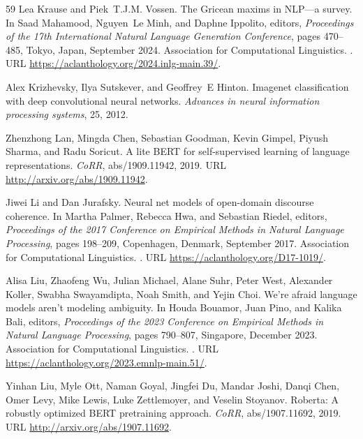 \begin{thebibliography}{59}
Lea Krause and Piek~T.J.M. Vossen.
\newblock The {G}ricean maxims in {NLP}---a survey.
\newblock In Saad Mahamood, Nguyen~Le Minh, and Daphne Ippolito, editors, \emph{Proceedings of the 17th International Natural Language Generation Conference}, pages 470--485, Tokyo, Japan, September 2024. Association for Computational Linguistics.
\newblock {}.
\newblock URL \url{https://aclanthology.org/2024.inlg-main.39/}.

Alex Krizhevsky, Ilya Sutskever, and Geoffrey~E Hinton.
\newblock Imagenet classification with deep convolutional neural networks.
\newblock \emph{Advances in neural information processing systems}, 25, 2012.

Zhenzhong Lan, Mingda Chen, Sebastian Goodman, Kevin Gimpel, Piyush Sharma, and Radu Soricut.
 {A} lite {BERT} for self-supervised learning of language representations.
\newblock \emph{CoRR}, abs/1909.11942, 2019.
\newblock URL \url{http://arxiv.org/abs/1909.11942}.

Jiwei Li and Dan Jurafsky.
\newblock Neural net models of open-domain discourse coherence.
\newblock In Martha Palmer, Rebecca Hwa, and Sebastian Riedel, editors, \emph{Proceedings of the 2017 Conference on Empirical Methods in Natural Language Processing}, pages 198--209, Copenhagen, Denmark, September 2017. Association for Computational Linguistics.
\newblock {}.
\newblock URL \url{https://aclanthology.org/D17-1019/}.

Alisa Liu, Zhaofeng Wu, Julian Michael, Alane Suhr, Peter West, Alexander Koller, Swabha Swayamdipta, Noah Smith, and Yejin Choi.
\newblock We{'}re afraid language models aren{'}t modeling ambiguity.
\newblock In Houda Bouamor, Juan Pino, and Kalika Bali, editors, \emph{Proceedings of the 2023 Conference on Empirical Methods in Natural Language Processing}, pages 790--807, Singapore, December 2023. Association for Computational Linguistics.
\newblock {}.
\newblock URL \url{https://aclanthology.org/2023.emnlp-main.51/}.

Yinhan Liu, Myle Ott, Naman Goyal, Jingfei Du, Mandar Joshi, Danqi Chen, Omer Levy, Mike Lewis, Luke Zettlemoyer, and Veselin Stoyanov.
\newblock Roberta: {A} robustly optimized {BERT} pretraining approach.
\newblock \emph{CoRR}, abs/1907.11692, 2019.
\newblock URL \url{http://arxiv.org/abs/1907.11692}.


\end{thebibliography}
